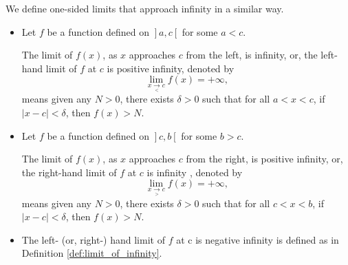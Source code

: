 \fi

\fi


We define one-sided limits that approach infinity in a similar way.

\begin{definition}\label{def:onesided_limit_of_infinity}
\begin{itemize}
\item \indent Let $f$ be a function defined on $\left.\right]a,c\left[\right.$ for some $a<c$. 

The limit of $f(x)$, as $x$ approaches $c$ from the left, is infinity, or, the left-hand limit of $f$ at $c$ is positive infinity, denoted by  
$$\displaystyle \lim_{x\underset{<}{\rightarrow}c} f(x) = +\infty,$$
means  given any $N > 0$, there exists $\delta > 0$ such that for all 
$a<x<c$,  
if  $|x - c| < \delta$, then $f(x) >N$.

\item \indent Let $f$ be a function defined on $\left.\right]c,b\left[\right.$ for some $b>c$. 

The limit of $f(x)$, as $x$ approaches $c$ from the right, is positive infinity, or, the right-hand limit of $f$ at $c$ is infinity
, denoted by  
$$\displaystyle \lim_{x\underset{>}{\rightarrow}c} f(x) = +\infty,$$
means  given any $N > 0$, there exists $\delta > 0$ such that for all 
$c<x<b$,  
if  $|x - c| < \delta$, then $f(x) >N$.

\item	The left- (or, right-) hand limit of $f$ at c is negative infinity is defined as in Definition \ref{def:limit_of_infinity}.
\end{itemize}
\end{definition}

